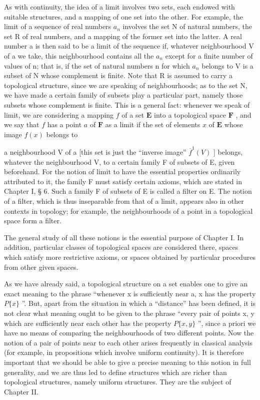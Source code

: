 As with continuity, the idea of a limit involves two sets, each endowed with suitable structures, and a mapping of one set into the other. For example, the limit of a sequence of real numbers \(a_{n}\) involves the set N of natural numbers, the set R of real numbers, and a mapping of the former set into the latter. A real number a is then said to be a limit of the sequence if, whatever neighbourhood V of a we take, this neighbourhood contains all the \(a_{n}\) except for a finite number of values of n; that is, if the set of natural numbers n for which \(a_{n}\) belongs to V is a subset of N whose complement is finite. Note that R is assumed to carry a topological structure, since we are speaking of neighbourhoods; as to the set N, we have made a certain family of subsets play a particular part, namely those subsets whose complement is finite. This is a general fact: whenever we speak of limit, we are considering a mapping \(f\) of a set \(\mathbf{E}\) into a topological space \(\mathbf{F}\) , and we say that \(f\) has a point \(a\) of \(\mathbf{F}\) as a limit if the set of elements \(x\) of \(\mathbf{E}\) whose image \(f(x)\) belongs to

a neighbourhood V of a {[}this set is just the ``inverse image'' \(\overline{f}^{1}(V)\) {]} belongs, whatever the neighbourhood V, to a certain family F of subsets of E, given beforehand. For the notion of limit to have the essential properties ordinarily attributed to it, the family F must satisfy certain axioms, which are stated in Chapter I, § 6. Such a family F of subsets of E is called a filter on E. The notion of a filter, which is thus inseparable from that of a limit, appears also in other contexts in topology; for example, the neighbourhoods of a point in a topological space form a filter.

The general study of all these notions is the essential purpose of Chapter I. In addition, particular classes of topological spaces are considered there, spaces which satisfy more restrictive axioms, or spaces obtained by particular procedures from other given spaces.

As we have already said, a topological structure on a set enables one to give an exact meaning to the phrase ``whenever x is sufficiently near a, x has the property \(P\{x\}\) ''. But, apart from the situation in which a ``distance'' has been defined, it is not clear what meaning ought to be given to the phrase ``every pair of points x, y which are sufficiently near each other has the property \(P\{x, y\}\) '', since a priori we have no means of comparing the neighbourhoods of two different points. Now the notion of a pair of points near to each other arises frequently in classical analysis (for example, in propositions which involve uniform continuity). It is therefore important that we should be able to give a precise meaning to this notion in full generality, and we are thus led to define structures which are richer than topological structures, namely uniform structures. They are the subject of Chapter II.


